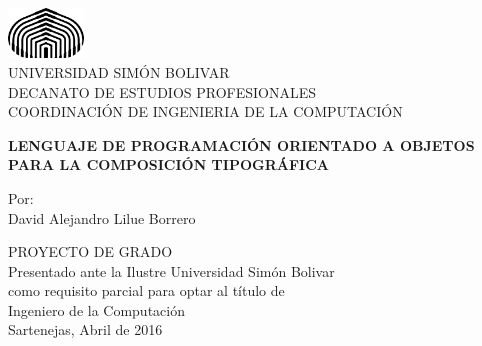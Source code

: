 \documentclass[12pt,letterpaper,titlepage,oneside,openright]{book}
\begin{document}
\frontmatter

\begin{titlepage}
    \begin{center}
        \includegraphics[width=0.15\textwidth]{logo}\\
        {\large UNIVERSIDAD SIMÓN BOLIVAR}\\
        DECANATO DE ESTUDIOS PROFESIONALES\\
        COORDINACIÓN DE INGENIERIA DE LA COMPUTACIÓN
        
        \vspace{6em}

        \textbf{LENGUAJE DE PROGRAMACIÓN ORIENTADO A OBJETOS PARA LA COMPOSICIÓN TIPOGRÁFICA}
        
        \vspace{6em}

        Por:\\
        David Alejandro Lilue Borrero\\

        \vspace{6em}

        PROYECTO DE GRADO\\
        Presentado ante la Ilustre Universidad Simón Bolivar\\
        como requisito parcial para optar al título de\\
        Ingeniero de la Computación\\
        
        \vfill
        Sartenejas, Abril de 2016
    \end{center}
\end{titlepage}
\end{document}
